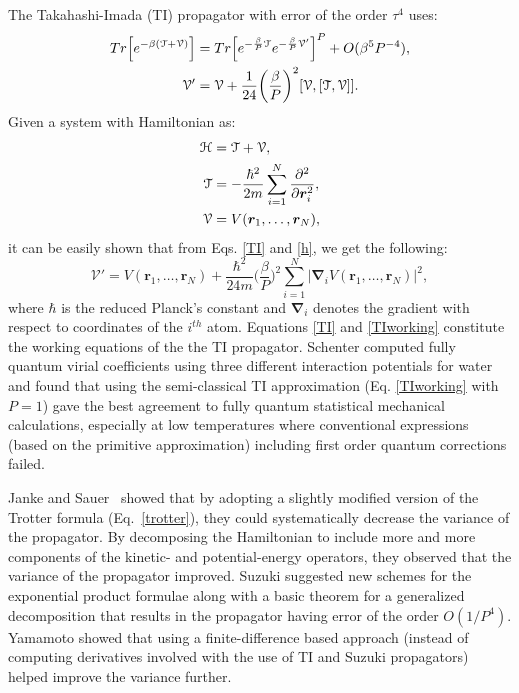         The Takahashi-Imada (TI) propagator \cite{Takahashi1984} with error of the order $\tau^4$ uses:
        \begin{equation} \label{TI}
            \begin{aligned}
                Tr \Big[ e^{- \beta ( \text{$\mathcal{T}$} + \text{$\mathcal{V}$} )} \Big] &= Tr \Big[ e^{ -\frac{\beta}{P} \text{$\mathcal{T}$}} e^{-\frac{\beta}{P} \mathcal{V'}} \Big]^P + O (\beta^5 P^{-4}),\\
                \mathcal{V'} &= \text{$\mathcal{V}$} + \frac{1}{24} \bigg( \frac{\beta}{P} \bigg)^2 [\text{$\mathcal{V}$}, [\text{$\mathcal{T}$}, \text{$\mathcal{V}$}]].
            \end{aligned}
        \end{equation}
        Given a system with Hamiltonian  as:
        \begin{equation} \label{h}
            \begin{aligned}
                \text{$\mathcal{H}$} &= \text{$\mathcal{T}$} + \text{$\mathcal{V}$},\\
                \text{$\mathcal{T}$} &= -\displaystyle\frac{\hbar^2}{2m} \sum\limits_{i=1}^N \frac{\partial^2}{\partial \bm{r}_i^2},\\
                \text{$\mathcal{V}$} &= V (\bm{r}_1, \ldots , \bm{r}_N),
            \end{aligned}
        \end{equation}
        it can be easily shown that from Eqs. \eqref{TI} and \eqref{h}, we get the following:
        \begin{equation} \label{TIworking}
            \mathcal{V'} = V (\bm{r}_1, \ldots ,\bm{r}_N) + \frac{\hbar^2}{24m} \bigg(\frac{\beta}{P} \bigg)^2 \displaystyle\sum\limits_{i=1}^N \big|\pmb{\nabla}_i V (\bm{r}_1, \ldots ,\bm{r}_N) \big|^2,
        \end{equation}
        where $\hbar$ is the reduced Planck's constant and $\pmb{\nabla}_i$ denotes the gradient with respect to coordinates of the $i^{th}$ atom. Equations \eqref{TI} and \eqref{TIworking} constitute the working equations of the the TI propagator. Schenter \cite{Schenter2002} computed fully quantum virial coefficients using three different interaction potentials for water and found that using the semi-classical TI approximation (Eq. \eqref{TIworking} with $P = 1$) gave the best agreement to fully quantum statistical mechanical calculations, especially at low temperatures where conventional expressions (based on the primitive approximation) including first order quantum corrections failed.

        Janke and Sauer~\cite{Janke1992} showed that by adopting a slightly modified version of the Trotter formula (Eq.~\eqref{trotter}), they could systematically decrease the variance of the propagator. By decomposing the Hamiltonian to include more and more components of the kinetic- and potential-energy operators, they observed that the variance of the propagator improved.
        Suzuki \cite{Suzuki1995} suggested new schemes for the exponential product formulae along with a basic theorem for a generalized decomposition that results in the propagator having error of the order $O(1/P^4)$. Yamamoto \cite{Yamamoto2005} showed that using a finite-difference based approach (instead of computing derivatives involved with the use of TI and Suzuki propagators) helped improve the variance further.
